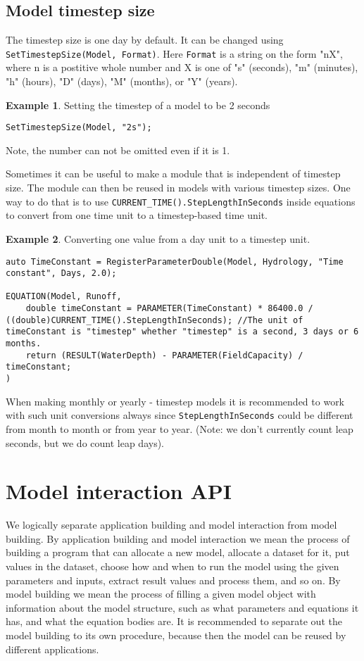 \documentclass[11pt]{article}
\theoremstyle{definition}
\newtheorem{myexample}{Example}
\newenvironment{example}%
  {\begin{lrbox}{\examplebox}%
   \begin{minipage}{\dimexpr\linewidth-2\fboxsep}
   \begin{myexample}}%
  {\end{myexample}%
   \end{minipage}%
   \end{lrbox}%
   \begin{trivlist}
     \item[]\colorbox{silver}{\usebox\examplebox}
   \end{trivlist}}
\begin{document}
\subsection{Model timestep size}\label{sec:timestepsize}

The timestep size is one day by default. It can be changed using {\tt SetTimestepSize(Model, Format)}. Here {\tt Format} is a string on the form "nX", where n is a postitive whole number and X is one of "s" (seconds), "m" (minutes), "h" (hours), "D" (days), "M" (months), or "Y" (years).
\begin{example}
Setting the timestep of a model to be 2 seconds
\begin{lstlisting}[style=mycpp]
SetTimestepSize(Model, "2s");
\end{lstlisting}
\end{example}
Note, the number can not be omitted even if it is 1.

Sometimes it can be useful to make a module that is independent of timestep size. The module can then be reused in models with various timestep sizes. One way to do that is to use {\tt CURRENT\_TIME().StepLengthInSeconds} inside equations to convert from one time unit to a timestep-based time unit.
\begin{example}
Converting one value from a day unit to a timestep unit.
\begin{lstlisting}[style=mycpp]
auto TimeConstant = RegisterParameterDouble(Model, Hydrology, "Time constant", Days, 2.0);

EQUATION(Model, Runoff,
	double timeConstant = PARAMETER(TimeConstant) * 86400.0 / ((double)CURRENT_TIME().StepLengthInSeconds); //The unit of timeConstant is "timestep" whether "timestep" is a second, 3 days or 6 months.
	return (RESULT(WaterDepth) - PARAMETER(FieldCapacity) / timeConstant;
)
\end{lstlisting}
\end{example}

When making monthly or yearly - timestep models it is recommended to work with such unit conversions always since {\tt StepLengthInSeconds} could be different from month to month or from year to year. (Note: we don't currently count leap seconds, but we do count leap days).

\section{Model interaction API}\label{sec:modelinteraction}

We logically separate application building and model interaction from model building. By application building and model interaction we mean the process of building a program that can allocate a new model, allocate a dataset for it, put values in the dataset, choose how and when to run the model using the given parameters and inputs, extract result values and process them, and so on. By model building we mean the process of filling a given model object with information about the model structure, such as what parameters and equations it has, and what the equation bodies are. It is recommended to separate out the model building to its own procedure, because then the model can be reused by different applications.
\end{document}
